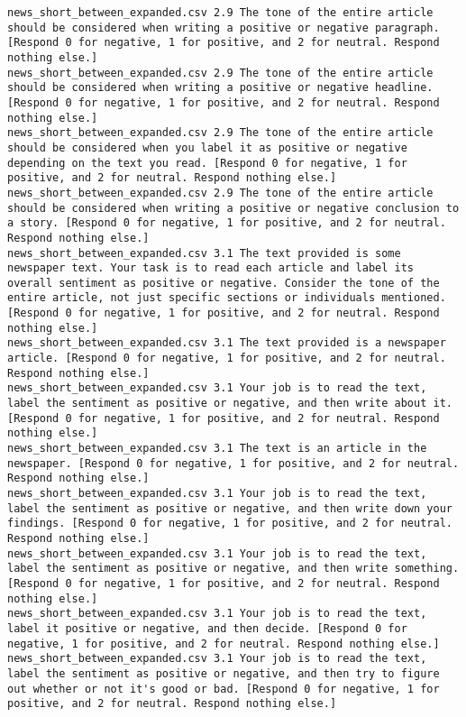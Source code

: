 \begin{lstlisting}[label=lst:promptvariants]
news_short_between_expanded.csv	2.9	The tone of the entire article should be considered when writing a positive or negative paragraph. [Respond 0 for negative, 1 for positive, and 2 for neutral. Respond nothing else.]
news_short_between_expanded.csv	2.9	The tone of the entire article should be considered when writing a positive or negative headline. [Respond 0 for negative, 1 for positive, and 2 for neutral. Respond nothing else.]
news_short_between_expanded.csv	2.9	The tone of the entire article should be considered when you label it as positive or negative depending on the text you read. [Respond 0 for negative, 1 for positive, and 2 for neutral. Respond nothing else.]
news_short_between_expanded.csv	2.9	The tone of the entire article should be considered when writing a positive or negative conclusion to a story. [Respond 0 for negative, 1 for positive, and 2 for neutral. Respond nothing else.]
news_short_between_expanded.csv	3.1	The text provided is some newspaper text. Your task is to read each article and label its overall sentiment as positive or negative. Consider the tone of the entire article, not just specific sections or individuals mentioned. [Respond 0 for negative, 1 for positive, and 2 for neutral. Respond nothing else.]
news_short_between_expanded.csv	3.1	The text provided is a newspaper article. [Respond 0 for negative, 1 for positive, and 2 for neutral. Respond nothing else.]
news_short_between_expanded.csv	3.1	Your job is to read the text, label the sentiment as positive or negative, and then write about it. [Respond 0 for negative, 1 for positive, and 2 for neutral. Respond nothing else.]
news_short_between_expanded.csv	3.1	The text is an article in the newspaper. [Respond 0 for negative, 1 for positive, and 2 for neutral. Respond nothing else.]
news_short_between_expanded.csv	3.1	Your job is to read the text, label the sentiment as positive or negative, and then write down your findings. [Respond 0 for negative, 1 for positive, and 2 for neutral. Respond nothing else.]
news_short_between_expanded.csv	3.1	Your job is to read the text, label the sentiment as positive or negative, and then write something. [Respond 0 for negative, 1 for positive, and 2 for neutral. Respond nothing else.]
news_short_between_expanded.csv	3.1	Your job is to read the text, label it positive or negative, and then decide. [Respond 0 for negative, 1 for positive, and 2 for neutral. Respond nothing else.]
news_short_between_expanded.csv	3.1	Your job is to read the text, label the sentiment as positive or negative, and then try to figure out whether or not it's good or bad. [Respond 0 for negative, 1 for positive, and 2 for neutral. Respond nothing else.]

\end{lstlisting}
